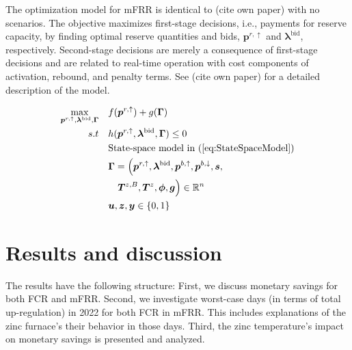 \documentclass[lettersize,journal]{IEEEtran}
\begin{document}
The optimization model for mFRR is identical to (cite own paper) with no scenarios. The objective maximizes first-stage decisions, i.e., payments for reserve capacity, by finding optimal reserve quantities and bids, $\bm{p}^{r,\uparrow}$ and $\bm{\lambda}^{\text{bid}}$, respectively. Second-stage decisions are merely a consequence of first-stage decisions and are related to real-time operation with cost components of activation, rebound, and penalty terms. See (cite own paper) for a detailed description of the model.

\begin{subequations}\label{P2:compact_model_mfrr}
    \begin{align}
        \underset{\bm{p}^{r,\uparrow}, \bm{\lambda}^{\text{bid}}, \bm{\Gamma}}{\textrm{max}} \quad & f(\bm{p}^{r,\uparrow}) + g(\bm{\Gamma}) \label{P2:eq1}
        \\
        s.t \quad                                                                                  & h(\bm{p}^{r,\uparrow}, \bm{\lambda}^{\text{bid}}, \bm{\Gamma}) \leq 0\label{P2:eq2}                                             \\
        \quad                                                                                      & \text{State-space model in } (\ref{eq:StateSpaceModel}) \label{P2:eq3}
        \\
        \quad                                                                                      & \bm{\Gamma} = \Bigl( \bm{p}^{r,\uparrow}, \bm{\lambda}^{\text{bid}}, \bm{p}^{b,\uparrow}, \bm{p}^{b,\downarrow}, \bm{s}, \notag \\ \quad & \quad \bm{T}^{z, B}, \bm{T}^{z}, \bm{\phi}, \bm{g} \Bigr) \in \mathbb{R}^{n}  \label{P2:eq4}
        \\
        \quad                                                                                      & \bm{u}, \bm{z}, \bm{y} \in \{0,1\}  \label{P2:eq5}
    \end{align}
\end{subequations}


\section{Results and discussion}

The results have the following structure: First, we discuss monetary savings for both FCR and mFRR. Second, we investigate worst-case days (in terms of total up-regulation) in 2022 for both FCR in mFRR. This includes explanations of the zinc furnace's their behavior in those days. Third, the zinc temperature's impact on monetary savings is presented and analyzed.
\end{document}
